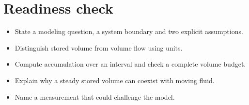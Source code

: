 \documentclass[11pt,letterpaper]{article}
\theoremstyle{definition}\newtheorem{definition}{Definition}\newtheorem{example}{Example}
\numberwithin{equation}{section}
\begin{document}
\section*{Readiness check}
\begin{itemize}
\item State a modeling question, a system boundary and two explicit assumptions.
\item Distinguish stored volume from volume flow using units.
\item Compute accumulation over an interval and check a complete volume budget.
\item Explain why a steady stored volume can coexist with moving fluid.
\item Name a measurement that could challenge the model.
\end{itemize}
\end{document}
